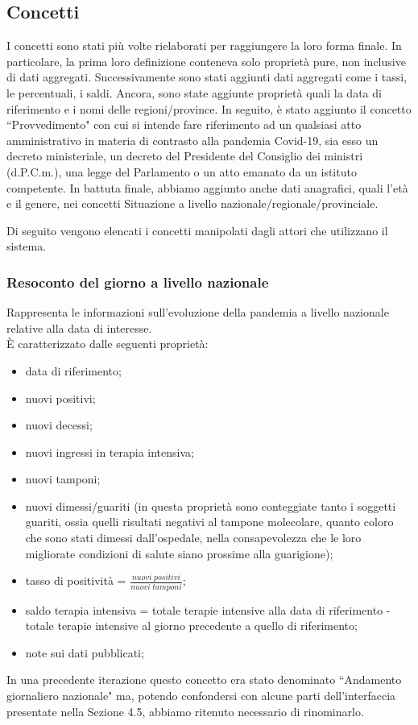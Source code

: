 \subsection{Concetti}
\label{ss:concetti}
I concetti sono stati più volte rielaborati per raggiungere la loro forma finale.
In particolare, la prima loro definizione conteneva solo proprietà pure, non inclusive di dati aggregati. Successivamente sono stati aggiunti dati aggregati come i tassi, le percentuali, i saldi.
Ancora, sono state aggiunte proprietà quali la data di riferimento e i nomi delle regioni/province.
In seguito, è stato aggiunto il concetto ``Provvedimento" con cui si intende fare riferimento ad un qualsiasi atto amministrativo in materia di contrasto alla pandemia Covid-19, sia esso un decreto ministeriale, un decreto del Presidente del Consiglio dei ministri (d.P.C.m.), una legge del Parlamento o un atto emanato da un istituto competente.
In battuta finale, abbiamo aggiunto anche dati anagrafici, quali l'età e il genere, nei concetti Situazione a livello nazionale/regionale/provinciale.

Di seguito vengono elencati i concetti manipolati dagli attori che utilizzano il sistema.

\subsubsection{Resoconto del giorno a livello nazionale}
\label{sss:resoconto-del-giorno-livello-nazionale}
Rappresenta le informazioni sull'evoluzione della pandemia a livello nazionale relative alla data di interesse.\\
È caratterizzato dalle seguenti proprietà:
\begin{itemize}
    \item data di riferimento;
    \item nuovi positivi;
    \item nuovi decessi;
    \item nuovi ingressi in terapia intensiva;
    \item nuovi tamponi;
    \item nuovi dimessi/guariti (in questa proprietà sono conteggiate tanto i soggetti guariti, ossia quelli risultati negativi al tampone molecolare, quanto coloro che sono stati dimessi dall'ospedale, nella consapevolezza che le loro migliorate condizioni di salute siano prossime alla guarigione);
    \item tasso di positività = $\frac{nuovi \; positivi}{nuovi \; tamponi}$;
    \item saldo terapia intensiva = totale terapie intensive alla data di riferimento - totale terapie intensive al giorno precedente a quello di riferimento;
    \item note sui dati pubblicati;
\end{itemize}
In una precedente iterazione questo concetto era stato denominato ``Andamento giornaliero nazionale" ma, potendo confondersi con alcune parti dell'interfaccia presentate nella Sezione 4.5, abbiamo ritenuto necessario di rinominarlo.

